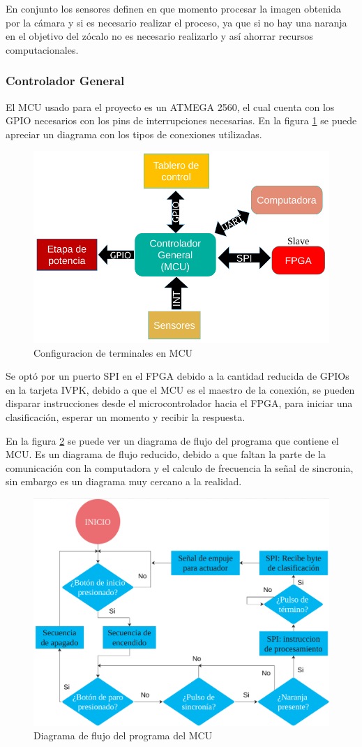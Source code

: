 \documentclass[twoside,spanish,ESP,MSc]{plantillaLabUPV}
\theoremstyle{definition}
\begin{document}
En conjunto los sensores definen en que momento procesar la imagen obtenida por la cámara y si es necesario realizar el proceso, ya que si no hay una naranja en el objetivo del zócalo no es necesario realizarlo y así ahorrar recursos computacionales.


\subsubsection{Controlador General}
El MCU usado para el proyecto es un ATMEGA 2560, el cual cuenta con los GPIO necesarios con los pins de interrupciones necesarias. En la figura \ref{fig:pins} se puede apreciar un diagrama con los tipos de conexiones utilizadas.

\begin{figure}
	\centering
	\includegraphics[width=0.7\linewidth]{edrawimas/pins}
	\caption{Configuracion de terminales en MCU}
	\label{fig:pins}
\end{figure}

Se optó por un puerto SPI en el FPGA debido a la cantidad reducida de GPIOs en la tarjeta IVPK, debido a que el MCU es el maestro de la conexión, se pueden disparar instrucciones desde el microcontrolador hacia el FPGA, para iniciar una clasificación, esperar un momento y recibir la respuesta.

En la figura \ref{fig:mcuprog} se puede ver un diagrama de flujo del programa que contiene el MCU. Es un diagrama de flujo reducido, debido a que faltan la parte de la comunicación con la computadora y el calculo de frecuencia la señal de sincronia, sin embargo es un diagrama muy cercano a la realidad.

\begin{figure}
	\centering
	\includegraphics[width=0.7\linewidth]{edrawimas/MCUprog}
	\caption{Diagrama de flujo del programa del MCU}
	\label{fig:mcuprog}
\end{figure}
\end{document}
